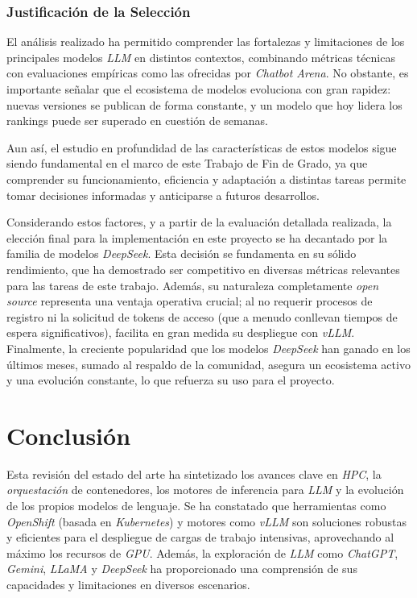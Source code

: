 \subsubsection*{Justificación de la Selección}
El análisis realizado ha permitido comprender las fortalezas y limitaciones de los principales modelos \textit{LLM} en distintos contextos, combinando métricas técnicas con evaluaciones empíricas como las ofrecidas por \textit{Chatbot Arena}. No obstante, es importante señalar que el ecosistema de modelos evoluciona con gran rapidez: nuevas versiones se publican de forma constante, y un modelo que hoy lidera los rankings puede ser superado en cuestión de semanas.

Aun así, el estudio en profundidad de las características de estos modelos sigue siendo fundamental en el marco de este Trabajo de Fin de Grado, ya que comprender su funcionamiento, eficiencia y adaptación a distintas tareas permite tomar decisiones informadas y anticiparse a futuros desarrollos.

Considerando estos factores, y a partir de la evaluación detallada realizada, la elección final para la implementación en este proyecto se ha decantado por la familia de modelos \textit{DeepSeek}. Esta decisión se fundamenta en su sólido rendimiento, que ha demostrado ser competitivo en diversas métricas relevantes para las tareas de este trabajo. Además, su naturaleza completamente \textit{open source} representa una ventaja operativa crucial; al no requerir procesos de registro ni la solicitud de tokens de acceso (que a menudo conllevan tiempos de espera significativos), facilita en gran medida su despliegue con \textit{vLLM}. Finalmente, la creciente popularidad que los modelos \textit{DeepSeek} han ganado en los últimos meses, sumado al respaldo de la comunidad, asegura un ecosistema activo y una evolución constante, lo que refuerza su uso para el proyecto.

\newpage
\section{Conclusión}
Esta revisión del estado del arte ha sintetizado los avances clave en \textit{HPC}, la \textit{orquestación} de contenedores, los motores de inferencia para \textit{LLM} y la evolución de los propios modelos de lenguaje. Se ha constatado que herramientas como \textit{OpenShift} (basada en \textit{Kubernetes}) y motores como \textit{vLLM} son soluciones robustas y eficientes para el despliegue de cargas de trabajo intensivas, aprovechando al máximo los recursos de \textit{GPU}. Además, la exploración de \textit{LLM} como \textit{ChatGPT}, \textit{Gemini}, \textit{LLaMA} y \textit{DeepSeek} ha proporcionado una comprensión de sus capacidades y limitaciones en diversos escenarios.

